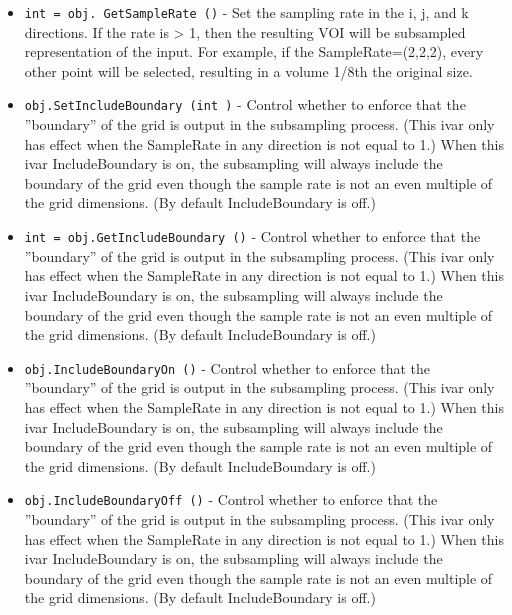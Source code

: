 \begin{itemize}
\item  \verb|int = obj. GetSampleRate ()| -  Set the sampling rate in the i, j, and k directions. If the rate is > 1,
 then the resulting VOI will be subsampled representation of the input.
 For example, if the SampleRate=(2,2,2), every other point will be
 selected, resulting in a volume 1/8th the original size.

\item  \verb|obj.SetIncludeBoundary (int )| -  Control whether to enforce that the ''boundary'' of the grid is output in
 the subsampling process. (This ivar only has effect when the SampleRate
 in any direction is not equal to 1.) When this ivar IncludeBoundary is
 on, the subsampling will always include the boundary of the grid even
 though the sample rate is not an even multiple of the grid
 dimensions. (By default IncludeBoundary is off.)

\item  \verb|int = obj.GetIncludeBoundary ()| -  Control whether to enforce that the ''boundary'' of the grid is output in
 the subsampling process. (This ivar only has effect when the SampleRate
 in any direction is not equal to 1.) When this ivar IncludeBoundary is
 on, the subsampling will always include the boundary of the grid even
 though the sample rate is not an even multiple of the grid
 dimensions. (By default IncludeBoundary is off.)

\item  \verb|obj.IncludeBoundaryOn ()| -  Control whether to enforce that the ''boundary'' of the grid is output in
 the subsampling process. (This ivar only has effect when the SampleRate
 in any direction is not equal to 1.) When this ivar IncludeBoundary is
 on, the subsampling will always include the boundary of the grid even
 though the sample rate is not an even multiple of the grid
 dimensions. (By default IncludeBoundary is off.)

\item  \verb|obj.IncludeBoundaryOff ()| -  Control whether to enforce that the ''boundary'' of the grid is output in
 the subsampling process. (This ivar only has effect when the SampleRate
 in any direction is not equal to 1.) When this ivar IncludeBoundary is
 on, the subsampling will always include the boundary of the grid even
 though the sample rate is not an even multiple of the grid
 dimensions. (By default IncludeBoundary is off.)

\end{itemize}
